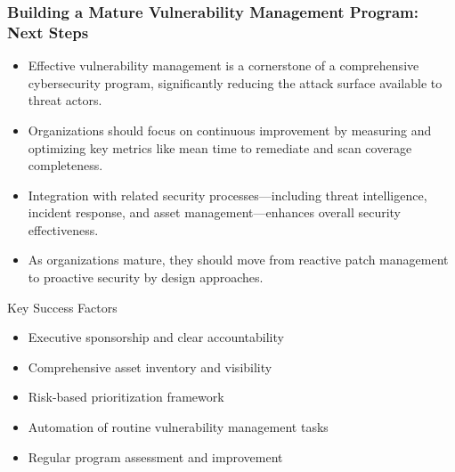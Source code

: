 \documentclass{beamer}
\begin{document}
    \begin{frame}
    \frametitle{Building a Mature Vulnerability Management Program: Next Steps}
    \begin{itemize}
        \item Effective vulnerability management is a cornerstone of a comprehensive cybersecurity program, significantly reducing the attack surface available to threat actors.
        \item Organizations should focus on continuous improvement by measuring and optimizing key metrics like mean time to remediate and scan coverage completeness.
        \item Integration with related security processes—including threat intelligence, incident response, and asset management—enhances overall security effectiveness.
        \item As organizations mature, they should move from reactive patch management to proactive security by design approaches.
    \end{itemize}
    
    \begin{block}{Key Success Factors}
    \scriptsize
    \begin{itemize}
        \item Executive sponsorship and clear accountability
        \item Comprehensive asset inventory and visibility
        \item Risk-based prioritization framework
        \item Automation of routine vulnerability management tasks
        \item Regular program assessment and improvement
    \end{itemize}
    \end{block}
    \end{frame}
\end{document}

